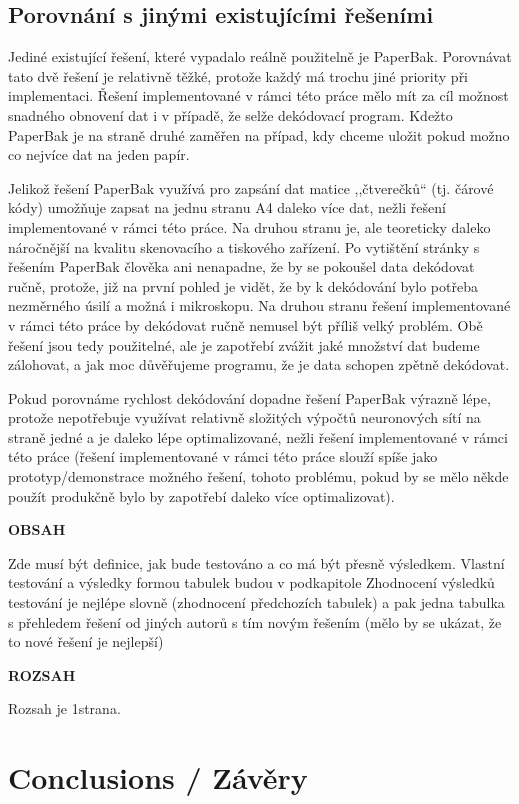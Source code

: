\documentclass[conference]{IEEEtran}
\begin{document}
\subsection{Porovnání s jinými existujícími řešeními}

Jediné existující řešení, které vypadalo reálně použitelně je PaperBak. Porovnávat tato dvě řešení je relativně těžké, protože každý má trochu jiné priority při implementaci. Řešení implementované v rámci této práce mělo mít za cíl možnost snadného obnovení dat i v případě, že selže dekódovací program. Kdežto PaperBak je na straně druhé zaměřen na případ, kdy chceme uložit pokud možno co nejvíce dat na jeden papír. 

Jelikož řešení PaperBak využívá pro zapsání dat matice ,,čtverečků`` (tj. čárové kódy) umožňuje zapsat na jednu stranu A4 daleko více dat, nežli řešení implementované v rámci této práce. Na druhou stranu je, ale teoreticky daleko náročnější na kvalitu skenovacího a tiskového zařízení. Po vytištění stránky s řešením PaperBak člověka ani nenapadne, že by se pokoušel data dekódovat ručně, protože, již na první pohled je vidět, že by k dekódování bylo potřeba nezměrného úsilí a možná i mikroskopu. Na druhou stranu řešení implementované v rámci této práce by dekódovat ručně nemusel být příliš velký problém. Obě řešení jsou tedy použitelné, ale je zapotřebí zvážit jaké množství dat budeme zálohovat, a jak moc důvěřujeme programu, že je data schopen zpětně dekódovat. 

Pokud porovnáme rychlost dekódování dopadne řešení PaperBak výrazně lépe, protože nepotřebuje využívat relativně složitých výpočtů neuronových sítí na straně jedné a je daleko lépe optimalizované, nežli řešení implementované v rámci této práce (řešení implementované v rámci této práce slouží spíše jako prototyp/demonstrace možného řešení, tohoto problému, pokud by se mělo někde použít produkčně bylo by zapotřebí daleko více optimalizovat).

\textbf{OBSAH}

Zde musí být definice, jak bude testováno a co má být přesně výsledkem.
Vlastní testování a výsledky formou tabulek budou v podkapitole
Zhodnocení výsledků testování je nejlépe slovně (zhodnocení předchozích tabulek) a pak jedna tabulka s přehledem řešení od jiných autorů s tím novým řešením (mělo by se ukázat, že to nové řešení je nejlepší)

\textbf{ROZSAH}

Rozsah je 1strana.

\section{Conclusions / Závěry}
\end{document}
